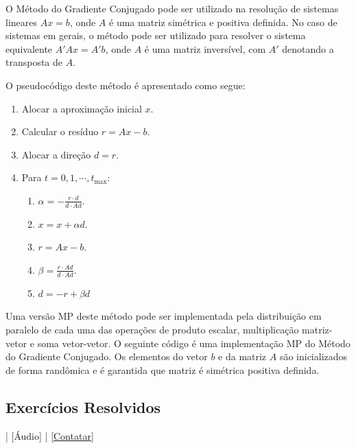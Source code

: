 O Método do Gradiente Conjugado pode ser utilizado na resolução de sistemas lineares $Ax = b$, onde $A$ é uma matriz simétrica e positiva definida. No caso de sistemas em gerais, o método pode ser utilizado para resolver o sistema equivalente $A'Ax = A'b$, onde $A$ é uma matriz inversível, com $A'$ denotando a transposta de $A$.

O pseudocódigo deste método é apresentado como segue:
\begin{enumerate}
\item Alocar a aproximação inicial $x$.
\item Calcular o resíduo $r = Ax - b$.
\item Alocar a direção $d = r$.
\item Para $t=0,1,\cdots,t_{\text{max}}$:
  \begin{enumerate}
  \item $\displaystyle \alpha = -\frac{r\cdot d}{d\cdot Ad}$.
  \item $x = x + \alpha d$.
  \item $r = Ax - b$.
  \item $\displaystyle \beta = \frac{r\cdot Ad}{d\cdot Ad}$.
  \item $d = -r + \beta d$
  \end{enumerate}
\end{enumerate}

Uma versão MP deste método pode ser implementada pela distribuição em paralelo de cada uma das operações de produto escalar, multiplicação matriz-vetor e soma vetor-vetor. O seguinte código é uma implementação MP do Método do Gradiente Conjugado. Os elementos do vetor $b$ e da matriz $A$ são inicializados de forma randômica e é garantida que matriz é simétrica positiva definida.



\subsection*{Exercícios Resolvidos}

\begin{flushright}
  [Vídeo] | [Áudio] | \href{https://phkonzen.github.io/notas/contato.html}{[Contatar]}
\end{flushright}

